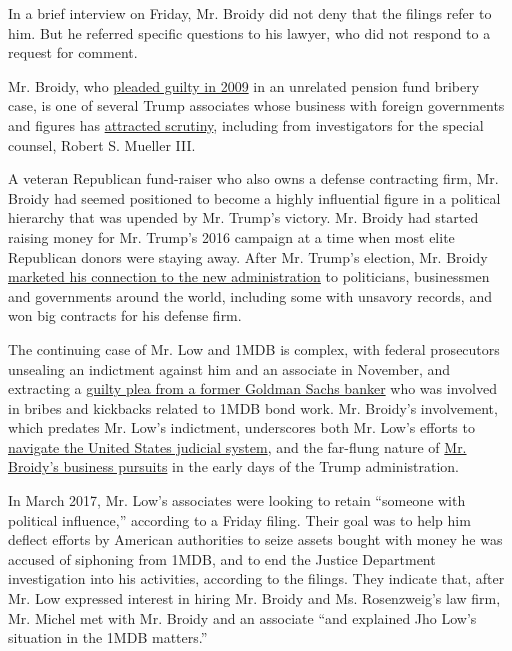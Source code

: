 In a brief interview on Friday, Mr. Broidy did not deny that the filings
refer to him. But he referred specific questions to his lawyer, who did
not respond to a request for comment.

Mr. Broidy, who
\href{https://dealbook.nytimes.com/2009/12/03/guilty-plea-in-new-york-pension-bribery-case/}{pleaded
guilty in 2009} in an unrelated pension fund bribery case, is one of
several Trump associates whose business with foreign governments and
figures has
\href{https://www.washingtonpost.com/politics/gop-fundraiser-broidy-under-investigation-for-alleged-effort-to-sell-government-influence-people-familiar-with-probe-say/2018/08/17/c9e55792-a185-11e8-8e87-c869fe70a721_story.html?utm_term=.0f1238b61ea0}{attracted
scrutiny}, including from investigators for the special counsel, Robert
S. Mueller III.

A veteran Republican fund-raiser who also owns a defense contracting
firm, Mr. Broidy had seemed positioned to become a highly influential
figure in a political hierarchy that was upended by Mr. Trump's victory.
Mr. Broidy had started raising money for Mr. Trump's 2016 campaign at a
time when most elite Republican donors were staying away. After Mr.
Trump's election, Mr. Broidy
\href{https://www.nytimes.com/2018/03/25/us/politics/elliott-broidy-trump-access-circinus-lobbying.html}{marketed
his connection to the new administration} to politicians, businessmen
and governments around the world, including some with unsavory records,
and won big contracts for his defense firm.

The continuing case of Mr. Low and 1MDB is complex, with federal
prosecutors unsealing an indictment against him and an associate in
November, and extracting a
\href{https://www.nytimes.com/2018/11/09/business/goldman-sachs-malaysia-1mdb.html}{guilty
plea from a former Goldman Sachs banker} who was involved in bribes and
kickbacks related to 1MDB bond work. Mr. Broidy's involvement, which
predates Mr. Low's indictment, underscores both Mr. Low's efforts to
\href{https://www.nytimes.com/2018/11/13/business/jho-low-1mdb-influence-campaign.html}{navigate
the United States judicial system}, and the far-flung nature of
\href{https://www.nytimes.com/2018/07/24/us/politics/rick-gates-elliott-broidy-trump-payments.html}{Mr.
Broidy's business pursuits} in the early days of the Trump
administration.

In March 2017, Mr. Low's associates were looking to retain ``someone
with political influence,'' according to a Friday filing. Their goal was
to help him deflect efforts by American authorities to seize assets
bought with money he was accused of siphoning from 1MDB, and to end the
Justice Department investigation into his activities, according to the
filings. They indicate that, after Mr. Low expressed interest in hiring
Mr. Broidy and Ms. Rosenzweig's law firm, Mr. Michel met with Mr. Broidy
and an associate ``and explained Jho Low's situation in the 1MDB
matters.''

